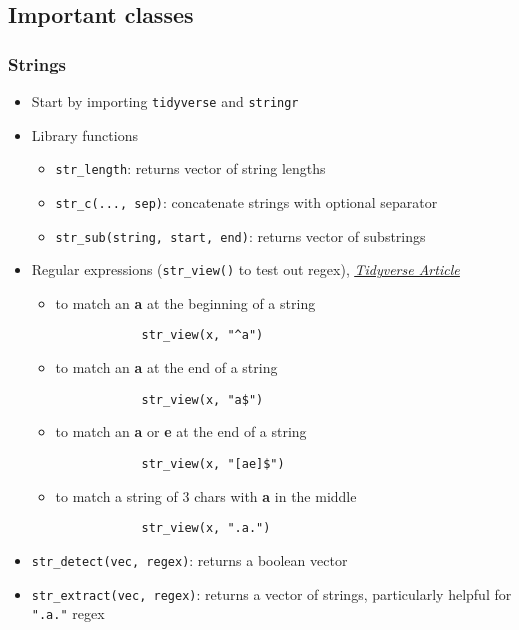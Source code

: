 \documentclass{article}
\begin{document}
\begin{multicols}{2}
\subsection*{Important classes}
\subsubsection*{Strings}
\begin{itemize}
	\item Start by importing \texttt{tidyverse} and \texttt{stringr}
	\item Library functions
	\begin{itemize}
		\item \texttt{str\_length}: returns vector of string lengths
		\item \texttt{str\_c(..., sep)}: concatenate strings with optional separator
		\item \texttt{str\_sub(string, start, end)}: returns vector of substrings
	\end{itemize}
	\item Regular expressions (\texttt{str\_view()} to test out regex), \href{https://stringr.tidyverse.org/articles/regular-expressions.html}{\textit{\underline{Tidyverse Article}}}
	\begin{itemize}
		\item to match an \textbf{a} at the beginning of a string
		\begin{verbatim}
			str_view(x, "^a")
		\end{verbatim}
		\item to match an \textbf{a} at the end of a string
		\begin{verbatim}
			str_view(x, "a$")
		\end{verbatim}
		\item to match an \textbf{a} or \textbf{e} at the end of a string
		\begin{verbatim}
			str_view(x, "[ae]$")
		\end{verbatim}
		\item to match a string of 3 chars with \textbf{a} in the middle
		\begin{verbatim}
			str_view(x, ".a.")
		\end{verbatim}
	\end{itemize}
	\item \texttt{str\_detect(vec, regex)}: returns a boolean vector
	\item \texttt{str\_extract(vec, regex)}: returns a vector of strings, particularly helpful for \texttt{".a."} regex
\end{itemize}

\end{multicols}
\end{document}
